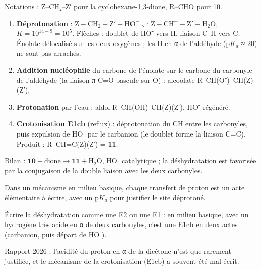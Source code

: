 \documentclass[11pt,a4paper]{article}
\providecommand{\tightlist}{\setlength{\itemsep}{0pt}\setlength{\parskip}{0pt}}
\begin{document}
Notations : Z--CH₂--Z′ pour la cyclohexane-1,3-dione, R--CHO pour 10.

\begin{enumerate}
\def\labelenumi{\arabic{enumi}.}
\tightlist
\item
  \textbf{Déprotonation} : \(\mathrm{Z{-}CH_2{-}Z'}+\mathrm{HO^-}\rightleftharpoons\mathrm{Z{-}CH^-{-}Z'}+\mathrm{H_2O}\), \(K=10^{14-9}=10^5\). Flèches : doublet de HO⁻ vers H, liaison C--H vers C. Énolate délocalisé sur les deux oxygènes ; les H en α de l'aldéhyde (p\(K_a\) ≈ 20) ne sont pas arrachés.
\item
  \textbf{Addition nucléophile} du carbone de l'énolate sur le carbone du carbonyle de l'aldéhyde (la liaison π C=O bascule sur O) : alcoolate R--CH(O⁻)--CH(Z)(Z′).
\item
  \textbf{Protonation} par l'eau : aldol R--CH(OH)--CH(Z)(Z′), HO⁻ régénéré.
\item
  \textbf{Crotonisation E1cb} (reflux) : déprotonation du CH entre les carbonyles, puis expulsion de HO⁻ par le carbanion (le doublet forme la liaison C=C). Produit : R--CH=C(Z)(Z′) = \textbf{11}.
\end{enumerate}

Bilan : \(\mathbf{10}+\text{dione}\to\mathbf{11}+\mathrm{H_2O}\), HO⁻ catalytique ; la déshydratation est favorisée par la conjugaison de la double liaison avec les deux carbonyles.

\begin{methode}

Dans un mécanisme en milieu basique, chaque transfert de proton est un acte élémentaire à écrire, avec un p\(K_a\) pour justifier le site déprotoné.

\end{methode}

\begin{piege}

Écrire la déshydratation comme une E2 ou une E1 : en milieu basique, avec un hydrogène très acide en α de deux carbonyles, c'est une E1cb en deux actes (carbanion, puis départ de HO⁻).

\end{piege}

\begin{jury}

Rapport 2026 : l'acidité du proton en α de la dicétone n'est que rarement justifiée, et le mécanisme de la crotonisation (E1cb) a souvent été mal écrit.

\end{jury}
\end{document}
